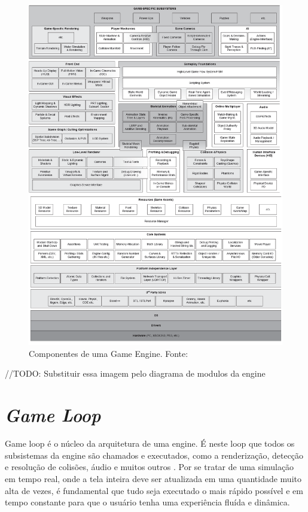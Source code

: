 \documentclass[12pt, 
openright, 
oneside, 
a4paper,    
brazil]{facom-ufu-abntex2}
\begin{document}
\begin{figure}[H]
	\centering
	\includegraphics[width=\textwidth]{imagens/engine_layers.png}
	\caption{Componentes de uma Game Engine. Fonte:~\cite{GameEngineArchitecture}
    \label{fig:arquitetura}}
\end{figure}

//TODO: Substituir essa imagem pelo diagrama de modulos da engine 

\section{\textit{Game Loop}}
Game loop é o núcleo da arquitetura de uma engine. É neste loop que todos os subsistemas da engine são chamados e  executados, como a renderização, detecção e resolução de colisões, áudio e muitos outros \cite{GameEngineArchitecture}. Por se tratar de uma simulação em tempo real, onde a tela inteira deve ser atualizada em uma quantidade muito alta de vezes, é fundamental que tudo seja executado o mais rápido possível e em tempo constante para que o usuário tenha uma experiência fluída e dinâmica.
\end{document}
